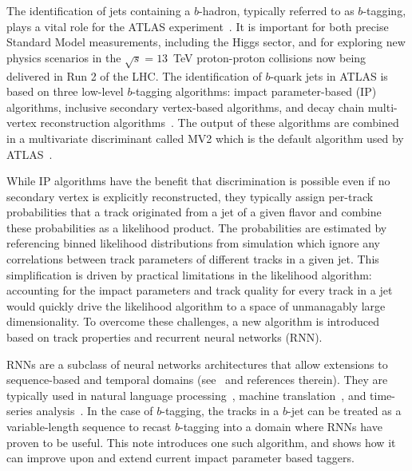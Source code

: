 The identification of jets containing a $b$-hadron, typically referred to as $b$-tagging, plays a vital role for the ATLAS experiment~\cite{ref:AtlasDet}. It is important for both precise Standard Model measurements, including the Higgs sector, and for exploring new physics scenarios in the $\sqrt{s}=13$~TeV proton-proton collisions now being delivered in Run 2 of the LHC. The identification of $b$-quark jets in ATLAS is based on three low-level $b$-tagging algorithms: impact parameter-based (IP) algorithms, inclusive secondary vertex-based algorithms, and decay chain multi-vertex reconstruction algorithms~\cite{ref:btagPaper}.  The output of these algorithms are combined in a multivariate discriminant called MV2 which is the default algorithm used by ATLAS~\cite{ATL-PHYS-PUB-2016-012}.

While IP algorithms have the benefit that discrimination is possible even if no secondary vertex is explicitly reconstructed, they typically assign per-track probabilities that a track originated from a jet of a given flavor and combine these probabilities as a likelihood product.
The probabilities are estimated by referencing binned likelihood distributions from simulation which ignore any correlations between track parameters of different tracks in a given jet.
This simplification is driven by practical limitations in the likelihood algorithm: accounting for the impact parameters and track quality for every track in a jet would quickly drive the likelihood algorithm to a space of unmanagably large dimensionality.
To overcome these challenges, a new algorithm is introduced based on track properties and recurrent neural networks (RNN).

RNNs are a subclass of neural networks architectures that allow extensions to sequence-based and temporal domains (see~\cite{ref:RNNthesis} and references therein).
They are typically used in natural language processing~\cite{languagemodel,DBLP:journals/corr/abs-1303-5778}, machine translation~\cite{MT,MT2}, and time-series analysis~\cite{timeseries,timeseries2}.
In the case of $b$-tagging, the tracks in a $b$-jet can be treated as a variable-length sequence to recast $b$-tagging into a domain where RNNs have proven to be useful. This note introduces one such algorithm, and shows how it can improve upon and extend current impact parameter based taggers.


